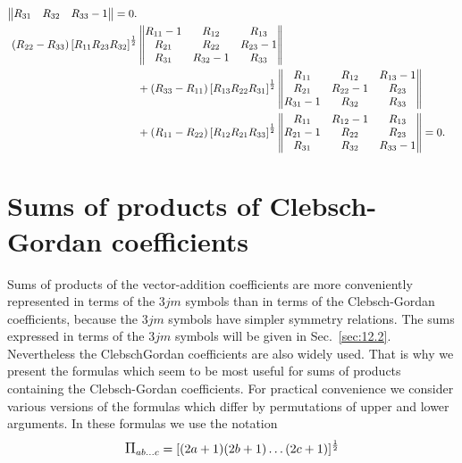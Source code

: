 \begin{align}
\begin{Vmatrix}
R_{31} & R_{32} & R_{33}-1
\end{Vmatrix}=0 . \label{eq:8:6:38}\\
 \left(R_{22}-R_{33}\right)\left[R_{11} R_{23} R_{32}\right]^{\frac{1}{2}}&\begin{Vmatrix}
R_{11}-1 & R_{12} & R_{13} \\
R_{21} & R_{22} & R_{23}-1 \\
R_{31} & R_{32}-1 & R_{33}
\end{Vmatrix}  \notag\\
& +\left(R_{33}-R_{11}\right)\left[R_{13} R_{22} R_{31}\right]^{\frac{1}{2}}\begin{Vmatrix}
R_{11} & R_{12} & R_{13}-1 \\
R_{21} & R_{22}-1 & R_{23} \\
R_{31}-1 & R_{32} & R_{33}
\end{Vmatrix}  \notag\\
& +\left(R_{11}-R_{22}\right)\left[R_{12} R_{21} R_{33}\right]^{\frac{1}{2}}\begin{Vmatrix}
R_{11} & R_{12}-1 & R_{13} \\
R_{21}-1 & R_{22} & R_{23} \\
R_{31} & R_{32} & R_{33}-1
\end{Vmatrix}=0 . \label{eq:8:6:39}
\end{align}
\section{Sums of products of Clebsch-Gordan coefficients}\label{sec:8.7}
Sums of products of the vector-addition coefficients are more conveniently represented in terms of the $3 j m$ symbols than in terms of the Clebsch-Gordan coefficients, because the $3 j m$ symbols have simpler symmetry relations. The sums expressed in terms of the $3 j m$ symbols will be given in Sec.~\ref{sec:12.2}. Nevertheless the ClebschGordan coefficients are also widely used. That is why we present the formulas which seem to be most useful for sums of products containing the Clebsch-Gordan coefficients. For practical convenience we consider various versions of the formulas which differ by permutations of upper and lower arguments. In these formulas we use the notation
\[
\Fact{a b \ldots c}=[(2 a+1)(2 b+1) \ldots(2 c+1)]^{\frac{1}{2}}
\]

